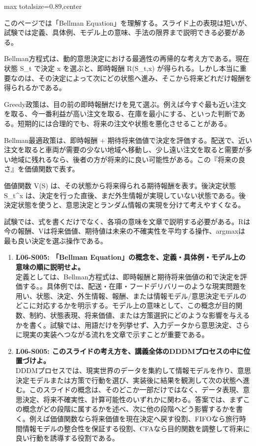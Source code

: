 \begin{minipage}[t]{0.58\textwidth}
\begin{adjustbox}{max totalsize={\textwidth}{0.89\textheight},center}
\begin{minipage}{\textwidth}\scriptsize
{}このページでは「Bellman Equation」を理解する。スライド上の表現は短いが、試験では定義、具体例、モデル上の意味、手法の限界まで説明できる必要がある。\par
Bellman方程式は、動的意思決定における最適性の再帰的な考え方である。現在状態 S\_t で決定 x を選ぶと、即時報酬 R(S\_t,x) が得られる。しかし本当に重要なのは、その決定によって次にどの状態へ進み、そこから将来どれだけ報酬を得られるかである。\par
Greedy政策は、目の前の即時報酬だけを見て選ぶ。例えば今すぐ最も近い注文を取る、今一番利益が高い注文を取る、在庫を最小にする、といった判断である。短期的には合理的でも、将来の注文や状態を悪化させることがある。\par
Bellman最適政策は、即時報酬 + 期待将来価値で決定を評価する。配送で、近い注文を取ると車両が需要の少ない地域へ移動し、少し遠い注文を取ると需要が多い地域に残れるなら、後者の方が将来的に良い可能性がある。この『将来の良さ』を価値関数で表す。\par
価値関数 V(S) は、その状態から将来得られる期待報酬を表す。後決定状態 S\_t\textasciicircum{}x は、決定を行った直後、まだ外生情報が実現していない状態である。後決定状態を使うと、意思決定とランダム情報の実現を分けて考えやすくなる。\par
試験では、式を書くだけでなく、各項の意味を文章で説明する必要がある。Rは今の報酬、Vは将来価値、期待値は未来の不確実性を平均する操作、argmaxは最も良い決定を選ぶ操作である。\par{}\begin{enumerate}\item \textbf{L06-S005: 「Bellman Equation」の概念を、定義・具体例・モデル上の意味の順に説明せよ。}\\定義としては、Bellman方程式は、即時報酬と期待将来価値の和で決定を評価する。。具体例では、配送・在庫・フードデリバリーのような現実問題を用い、状態、決定、外生情報、報酬、または情報モデル/意思決定モデルのどこに対応するかを明示する。モデル上の意味として、この概念が目的関数、制約、状態表現、将来価値、または方策選択にどのような影響を与えるかを書く。試験では、用語だけを列挙せず、入力データから意思決定、さらに現実の実装へつながる流れを文章で示すことが重要である。\item \textbf{L06-S005: このスライドの考え方を、講義全体のDDDMプロセスの中に位置づけよ。}\\DDDMプロセスでは、現実世界のデータを集約して情報モデルを作り、意思決定モデルまたは方策で行動を選び、実装後に結果を観測して次の状態へ進む。このスライドの概念は、そのどこか一部だけではなく、データ表現、意思決定、将来不確実性、計算可能性のいずれかに関わる。答案では、まずこの概念がどの段階に属するかを述べ、次に他の段階へどう影響するかを書く。例えば価値関数なら将来価値を現在決定へ戻す役割、FIFOなら旅行時間情報モデルの整合性を保証する役割、CFAなら目的関数を調整して将来に良い行動を誘導する役割である。\end{enumerate}

\end{minipage}
\end{adjustbox}
\end{minipage}
